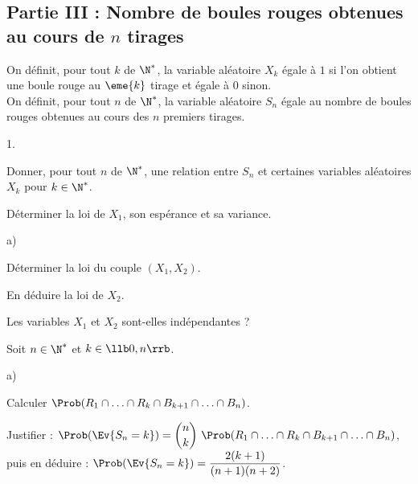 \subsection*{Partie III : Nombre de boules rouges obtenues au cours de 
$n$ tirages}

\noindent 
On définit, pour tout $k$ de $\N^*$, la variable aléatoire $X_k$ égale
à $1$ si l'on obtient une boule rouge au $\eme{k}$ tirage et égale à
$0$ sinon.\\
On définit, pour tout $n$ de $\N^*$, la variable aléatoire $S_n$ égale
au nombre de boules rouges obtenues au cours des $n$ premiers tirages.
\begin{noliste}{1.}
  \setcounter{enumi}{4}
\item Donner, pour tout $n$ de $\N^*$, une relation entre $S_n$ et
  certaines variables aléatoires $X_k$ pour $k \in \N^*$.
  
  

\item Déterminer la loi de $X_1$, son espérance et sa variance.

  

\item
  \begin{noliste}{a)}
  \item Déterminer la loi du couple $(X_1, X_2)$.

    

  \item En déduire la loi de $X_2$.

    

  \item Les variables $X_1$ et $X_2$ sont-elles indépendantes ?

    
  \end{noliste}

\item Soit $n \in \N^*$ et $k \in \llb 0, n \rrb$.
  \begin{noliste}{a)}
  \item Calculer $\Prob(R_1 \cap \ldots \cap R_k \cap B_{k+1} \cap
    \ldots \cap B_n)$.

    




  \item Justifier : $\Prob(\Ev{S_n = k}) = \dbinom{n}{k} \ \Prob(R_1
    \cap \ldots \cap R_k \cap B_{k+1} \cap \ldots \cap B_n)$,\\
    puis en déduire : $\Prob(\Ev{S_n = k}) =
    \dfrac{2(k+1)}{(n+1)(n+2)}$.


\end{noliste}
\end{noliste}
